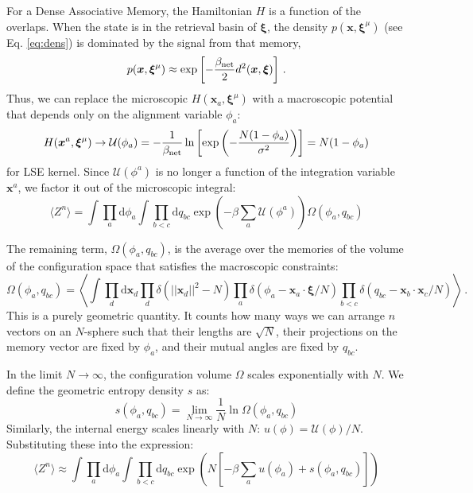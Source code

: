 \documentclass{article}
\newcommand{\dd}{{\mathrm{d}}}
\theoremstyle{plain}
\theoremstyle{definition}
\theoremstyle{remark}
\begin{document}
For a Dense Associative Memory, the Hamiltonian $H$ is a function of the overlaps. When the state is in the retrieval basin of $\bm{\xi}$, the density $p(\bm{x}, \bm{\xi}^\mu)$ (see Eq. \ref{eq:dens}) is dominated by the signal from that memory,
\begin{equation}
    p(\bm{x}, \bm{\xi}^\mu) \approx \exp\left[ - \frac{\beta_{\rm net}}{2} d^2(\bm{x}, \bm{\xi}) \right] \,.
    \label{eq:dens_red}    
\end{equation}
Thus, we can replace the microscopic $H(\bm{x}_a, \bm{\xi}^\mu)$ with a macroscopic potential that depends only on the alignment variable $\phi_a$:
\begin{equation}
    H(\bm{x}^a, \bm{\xi}^\mu) \to \mathcal{U}(\phi_a) = -\frac{1}{\beta_{\rm net}} \ln \left[  \exp\left( -\frac{N(1 - \phi_a)}{\sigma^2} \right) \right] = N(1-\phi_a)
\end{equation}
for LSE kernel. Since $\mathcal{U}(\phi^a)$ is no longer a function of the integration variable $\bm{x}^a$, we factor it out of the microscopic integral:
\begin{equation}
    \langle Z^n \rangle = \int \prod_a \dd \phi_a \int \prod_{b<c}  \dd q_{bc} \exp\left(-\beta \sum_a \mathcal{U}(\phi^a)\right)  \Omega(\phi_a, q_{bc})
\end{equation}


The remaining term, $\Omega(\phi_a, q_{bc})$, is the average over the memories of the volume of the configuration space that satisfies the macroscopic constraints:
\begin{equation}
\Omega(\phi_a, q_{bc}) = \left\langle \int \prod_d \dd \bm{x}_d \prod_d \delta(||\bm{x}_d||^2 - N) \prod_a \delta(\phi_a - \bm{x}_a \cdot \bm{\xi}/N) \prod_{b<c} \delta(q_{bc} - \bm{x}_b \cdot \bm{x}_c/N) \right\rangle\,.
\end{equation}
This is a purely geometric quantity. It counts how many ways we can arrange $n$ vectors on an $N$-sphere such that their lengths are $\sqrt{N}$, their projections on the memory vector are fixed by $\phi_a$, and their mutual angles are fixed by $q_{bc}$.

In the limit $N \to \infty$, the configuration volume $\Omega$ scales exponentially with $N$. We define the geometric entropy density $s$ as:
$$s(\phi_a, q_{bc}) = \lim_{N \to \infty} \frac{1}{N} \ln \Omega(\phi_a, q_{bc})$$
Similarly, the internal energy scales linearly with $N$: $u(\phi) = \mathcal{U}(\phi)/N$. Substituting these into the expression:
\begin{equation}
    \langle Z^n \rangle \approx \int \prod_a \dd \phi_a \int \prod_{b<c}  \dd q_{bc} \exp\left( N \left[ -\beta \sum_a u(\phi_a) + s(\phi_a, q_{bc}) \right] \right)
\end{equation}
\end{document}
